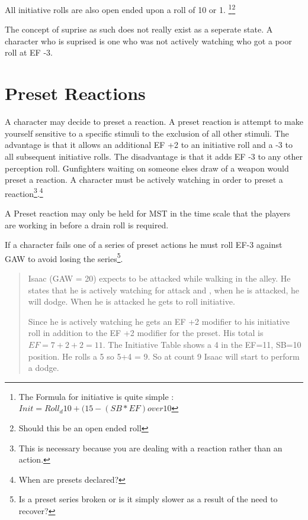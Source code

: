 All initiative rolls are also open ended upon a roll of 10 or 1.
\footnote{The Formula for initiative is quite simple : \(Init= 
Roll_d10 + ( 15 - {(SB*EF) over 10}\) }\footnote{ Should this be an 
open ended roll}





The concept of suprise as such does not really exist as a seperate 
state. A character who is suprised is one who was not actively 
watching who got a poor roll at EF -3.

\section{Preset Reactions}

A character may decide to preset a reaction. A preset reaction is 
attempt to make yourself sensitive to a specific stimuli to the exclusion
of all other stimuli. The advantage is that it allows an additional EF +2 
to an initiative roll and a -3 to all subsequent initiative rolls. 
The disadvantage is that it adds EF -3 to any other perception roll. 
Gunfighters waiting on someone elses draw of a weapon would preset a
reaction. A character must be actively watching in order to preset a
reaction\footnote{This is necessary because you are dealing with a
reaction rather than an action.}.\footnote{When are presets declared?}

A Preset reaction may only be held for MST in the time scale 
that the players are working in before a drain roll is required.

If a character fails one of a series of preset actions he must roll 
EF-3 against GAW to avoid losing the series\footnote{Is a preset 
series broken or is it simply slower as a result of the need to 
recover? }.

\begin{quote}
Isaac (GAW = 20) expects to be attacked while walking in the alley. 
He states that he is actively watching for attack and , when he is 
attacked, he will dodge. When he is attacked he gets to roll 
initiative.  

Since he is actively watching he gets an EF +2 modifier to his 
initiative roll in addition to the EF +2 modifier for the preset. His 
total is \( EF = 7+2+2 = 11\). The Initiative Table shows a 4 in the 
EF=11, SB=10 position. He rolls a 5 so 5+4 = 9. So at count 9 Isaac 
will start to perform a dodge.
\end{quote}

